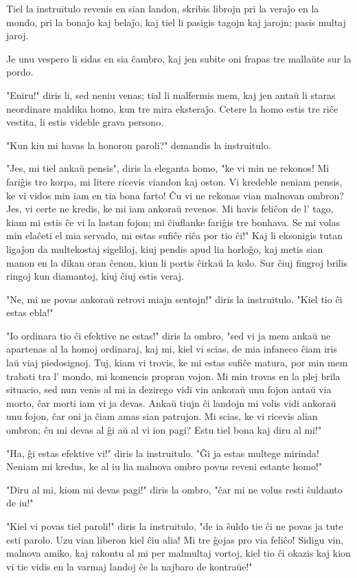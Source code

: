 Tiel la instruitulo revenis en sian landon, skribis librojn pri la veraĵo en la mondo, pri la bonaĵo kaj belaĵo, kaj tiel li pasigis tagojn kaj jarojn; pasis multaj jaroj.

Je unu vespero li sidas en sia ĉambro, kaj jen subite oni frapas tre mallaŭte sur la pordo.

"Eniru!" diris li, sed neniu venas; tial li malfermis mem, kaj jen antaŭ li staras neordinare maldika homo, kun tre mira eksteraĵo. Cetere la homo estis tre riĉe vestita, li estis videble grava persono.

"Kun kiu mi havas la honoron paroli?" demandis la instruitulo.

"Jes, mi tiel ankaŭ pensis", diris la eleganta homo, "ke vi min ne rekonos! Mi fariĝis tro korpa, mi litere ricevis viandon kaj oston. Vi kredeble neniam pensis, ke vi vidos min iam en tia bona farto! Ĉu vi ne rekonas vian malnovan ombron? Jes, vi certe ne kredis, ke mi iam ankoraŭ revenos. Mi havis feliĉon de l' tago, kiam mi estis ĉe vi la lastan fojon; mi ĉiuflanke fariĝis tre bonhava. Se mi volas min elaĉeti el mia servado, mi estas sufiĉe riĉa por tio ĉi!" Kaj li eksonigis tutan ligaĵon da multekostaj sigeliloj, kiuj pendis apud lia horloĝo, kaj metis sian manon en la dikan oran ĉenon, kiun li portis ĉirkaŭ la kolo. Sur ĉiuj fingroj brilis ringoj kun diamantoj, kiuj ĉiuj estis veraj.

"Ne, mi ne povas ankoraŭ retrovi miajn sentojn!" diris la instruitulo. "Kiel tio ĉi estas ebla!"

"Io ordinara tio ĉi efektive ne estas!" diris la ombro, "sed vi ja mem ankaŭ ne apartenas al la homoj ordinaraj, kaj mi, kiel vi scias, de mia infaneco ĉiam iris laŭ viaj piedosignoj. Tuj, kiam vi trovis, ke mi estas sufiĉe matura, por min mem trabati tra l' mondo, mi komencis propran vojon. Mi min trovas en la plej brila situacio, sed nun venis al mi ia dezirego vidi vin ankoraŭ unu fojon antaŭ via morto, ĉar morti iam vi ja devas. Ankaŭ tiujn ĉi landojn mi volis vidi ankoraŭ unu fojon, ĉar oni ja ĉiam amas sian patrujon. Mi scias, ke vi ricevis alian ombron; ĉu mi devas al ĝi aŭ al vi ion pagi? Estu tiel bona kaj diru al mi!"

"Ha, ĝi estas efektive vi!" diris la instruitulo. "Ĝi ja estas multege mirinda! Neniam mi kredus, ke al iu lia malnova ombro povus reveni estante homo!"

"Diru al mi, kiom mi devas pagi!" diris la ombro, "ĉar mi ne volus resti ŝuldanto de iu!"

"Kiel vi povas tiel paroli!" diris la instruitulo, "de ia ŝuldo tie ĉi ne povas ja tute esti parolo. Uzu vian liberon kiel ĉiu alia! Mi tre ĝojas pro via feliĉo! Sidigu vin, malnova amiko, kaj rakontu al mi per malmultaj vortoj, kiel tio ĉi okazis kaj kion vi tie vidis en la varmaj landoj ĉe la najbaro de kontraŭe!"

